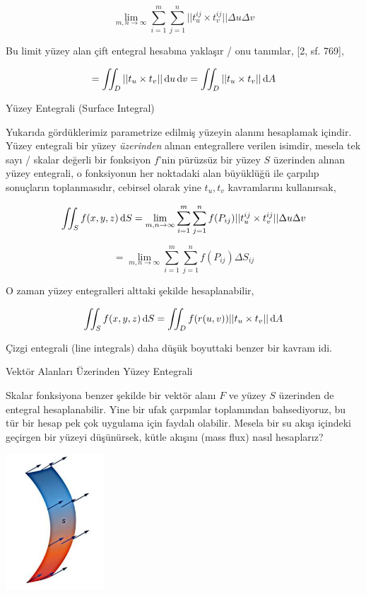 \documentclass[12pt,fleqn]{article}\usepackage{../../common}
\begin{document}
$$
\lim_{m,n \to \infty} \sum_{i=1}^{m} \sum_{j=1}^{n} || t_u^{ij} \times t_v^{ij} || \Delta u \Delta v
$$

Bu limit yüzey alan çift entegral hesabına yaklaşır / onu tanımlar, [2, sf. 769],

$$
= \iint_D || t_u \times t_v || \,\mathrm{d} u \,\mathrm{d} v = \iint_D || t_u \times t_v || \,\mathrm{d} A
$$

Yüzey Entegrali (Surface Integral)

Yukarıda gördüklerimiz parametrize edilmiş yüzeyin alanını hesaplamak içindir.
Yüzey entegrali bir yüzey {\em üzerinden} alınan entegrallere verilen isimdir,
mesela tek sayı / skalar değerli bir fonksiyon $f$'nin pürüzsüz bir yüzey $S$
üzerinden alınan yüzey entegrali, o fonksiyonun her noktadaki alan büyüklüğü ile
çarpılıp sonuçların toplanmasıdır, cebirsel olarak yine $t_u,t_v$ kavramlarını
kullanırsak,

$$
\iint_S f(x,y,z) \,\mathrm{d} S 
= \lim_{m,n \to \infty} \sum_{i=1}^{m} \sum_{j=1}^{n} f(P_{ij}) || t_u^{ij} \times t_v^{ij} || \Delta u \Delta v
$$

$$
= \lim_{m,n \to \infty} \sum_{i=1}^{m} \sum_{j=1}^{n} f(P_{ij}) \Delta S_{ij} 
$$

O zaman yüzey entegralleri alttaki şekilde hesaplanabilir,

$$
\iint_S f(x,y,z) \,\mathrm{d} S =
\iint_D f(r(u,v)) || t_u \times t_v || \,\mathrm{d} A
$$

Çizgi entegrali (line integrals) daha düşük boyuttaki benzer bir kavram idi.

Vektör Alanları Üzerinden Yüzey Entegrali

Skalar fonksiyona benzer şekilde bir vektör alanı $F$ ve yüzey $S$ üzerinden de
entegral hesaplanabilir. Yine bir ufak çarpımlar toplamından bahsediyoruz, bu
tür bir hesap pek çok uygulama için faydalı olabilir. Mesela bir su akışı
içindeki geçirgen bir yüzeyi düşünürsek, kütle akışını (mass flux) nasıl
hesaplarız? 

\includegraphics[width=10em]{calc_multi_75_app_04.jpg}
\end{document}
